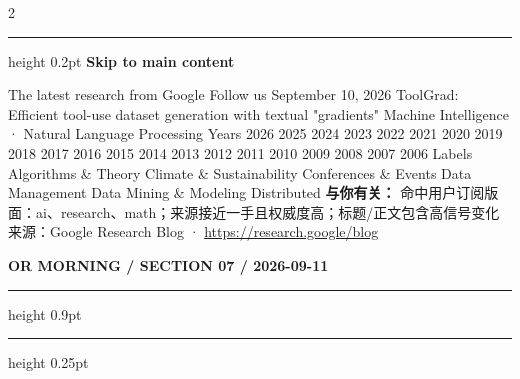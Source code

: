 \documentclass[10.5pt]{ctexart}
\begin{document}
\begin{multicols}{2}
\hrule height 0.2pt
\vspace{2mm}
{\large\bfseries Skip to main content}\par
The latest research from Google Follow us September 10, 2026 ToolGrad: Efficient tool-use dataset generation with textual "gradients" Machine Intelligence · Natural Language Processing Years 2026 2025 2024 2023 2022 2021 2020 2019 2018 2017 2016 2015 2014 2013 2012 2011 2010 2009 2008 2007 2006 Labels Algorithms \& Theory Climate \& Sustainability Conferences \& Events Data Management Data Mining \& Modeling Distributed 
\textbf{与你有关：} 命中用户订阅版面：ai、research、math；来源接近一手且权威度高；标题/正文包含高信号变化
{\footnotesize\color{ormuted} 来源：Google Research Blog · \url{https://research.google/blog}}
\end{multicols}
\newpage
{\small\bfseries OR MORNING / SECTION 07 / 2026-09-11}
\vspace{2mm}
\hrule height 0.9pt
\vspace{1.5mm}
\hrule height 0.25pt
\vspace{4mm}
\end{document}
